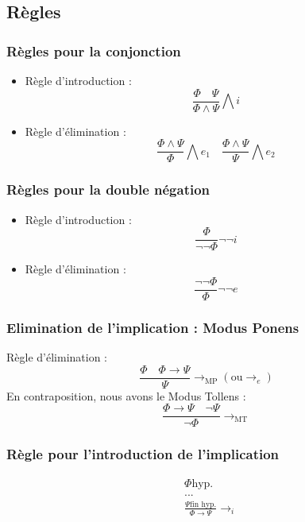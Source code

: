 \documentclass[a4paper, 12pt]{extarticle}
\begin{document}
\subsection{Règles}
\subsubsection{Règles pour la conjonction}
\begin{itemize}[label=$\bullet$]
  \item Règle d'introduction :
  \begin{equation*}
    \frac{\Phi\quad\Psi}{\Phi\land\Psi}\bigwedge i
  \end{equation*}
  \item Règle d'élimination :
  \begin{equation*}
    \frac{\Phi\land\Psi}{\Phi}\bigwedge e_1\quad\frac{\Phi\land\Psi}{\Psi}\bigwedge e_2
  \end{equation*}
\end{itemize}
\subsubsection{Règles pour la double négation}
\begin{itemize}[label=$\bullet$]
  \item Règle d'introduction :
  \begin{equation*}
    \frac{\Phi}{\neg\neg\Phi}\neg\neg i
  \end{equation*}
  \item Règle d'élimination :
  \begin{equation*}
    \frac{\neg\neg\Phi}{\Phi}\neg\neg e
  \end{equation*}
\end{itemize}
\subsubsection{Elimination de l'implication : Modus Ponens}
Règle d'élimination :
\begin{equation*}
  \frac{\Phi\quad\Phi\rightarrow\Psi}{\Psi}\rightarrow_\text{MP} (\text{ou} \rightarrow_e)
\end{equation*}
En contraposition, nous avons le Modus Tollens :
\begin{equation*}
  \frac{\Phi\rightarrow\Psi\quad\neg\Psi}{\neg\Phi}\rightarrow_\text{MT}
\end{equation*}
\subsubsection{Règle pour l'introduction de l'implication}
\begin{align*}
  &\Phi\text{hyp.} \\
  &...\\
  &\frac{\Psi\text{fin hyp.}}{\Phi\rightarrow\Psi}\rightarrow_i
\end{align*}
\end{document}
